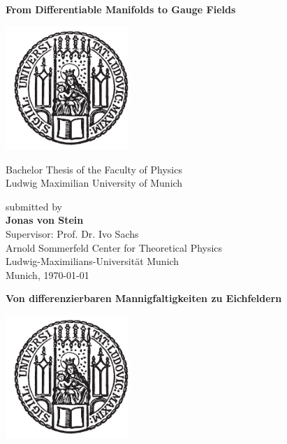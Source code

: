 \documentclass[a4paper,11pt,twoside,openright]{report}
\newcommand{\thesistitleEng}{From Differentiable Manifolds to Gauge Fields}
\newcommand{\thesistitleDe}{Von differenzierbaren Mannigfaltigkeiten zu Eichfeldern}
\newcommand{\authorname}{Jonas von Stein}
\newcommand{\thesisdate}{\today}
\begin{document}
\pagestyle{empty}
\begin{titlepage}
  \begin{center}
    \vspace*{0.65cm}
    \huge
    \hspace*{-0.73cm}
    \textbf{\thesistitleEng}\\
    \vspace*{2.2cm}

    \includegraphics[width=0.35\textwidth]{figures/lmu_siege1.pdf}

    \vspace*{0.5cm}
    \Large
    Bachelor Thesis of the Faculty of Physics\\
    Ludwig Maximilian University of Munich

    \vspace*{3.5cm}
    \large
    submitted by\\[0.1cm]
    \Large \textbf{\authorname}\\

    \vfill
    \large
    Supervisor: Prof. Dr. Ivo Sachs\\[0.1cm]
    Arnold Sommerfeld Center for Theoretical Physics \\ Ludwig-Maximilians-Universität Munich\\
    \vspace*{1.5cm}
    Munich, \thesisdate
  \end{center}

\cleardoublepage

  \begin{center}
    \vspace*{0.65cm}
    \huge
    \hspace*{-0.73cm}
    \textbf{\thesistitleDe}\\
    \vspace*{2.2cm}

    \includegraphics[width=0.35\textwidth]{figures/lmu_siege1.pdf}


\end{center}
\end{titlepage}
\end{document}
